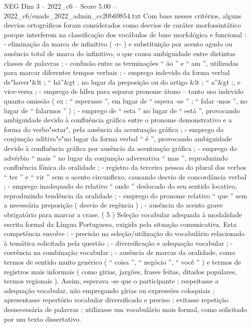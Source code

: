 \begin{textsample}{NEG Dim 3 – 2022\_c6 – Score 5.00 – 2022\_c6/enade\_2022\_admin\_cc20b69854.txt}
Com base nesses critérios, alguns desvios ortográficos foram considerados como desvios de caráter morfossintático porque interferem na classificação dos vocábulos de base morfológica e funcional : - eliminação da marca de infinitivo ( -r- ) e substituição por acento agudo ou ausência total de marca do infinitivo, o que causa ambiguidade entre distintas classes de palavras ; - confusão entre as terminações “ ão ” e “ am ”, utilizadas para marcar diferentes tempos verbais ; - emprego indevido da forma verbal de"haver"\&lt ; “ há”\&gt ; no lugar da preposição ou do artigo \&lt ; “ a”\&gt ;, e vice-versa ; - emprego de hífen para separar pronome átono – tanto uso indevido quanto omissão ( ex : “ esperasse ”, em lugar de “ espera -se ” ; “ falar -mos ”, no lugar de “ falarmos ” ) ; - emprego de “ esta ” no lugar de “ está ”, provocando ambiguidade devido à confluência gráfica entre o pronome demonstrativo e a forma do verbo"estar", pela ausência da acentuação gráfica ; - emprego da conjunção aditiva"e"no lugar da forma verbal “ é ”, provocando ambiguidade devido à confluência gráfica por ausência da acentuação gráfica ; - emprego do advérbio “ mais ” no lugar da conjunção adversativa “ mas ”, reproduzindo confluência fônica da oralidade ; - registro da terceira pessoa do plural dos verbos “ ter ” e “ vir ” sem o acento circunflexo, causando desvio de concordância verbal ; - emprego inadequado do relativo “ onde ” deslocado do seu sentido locativo, reproduzindo tendência da oralidade ; - emprego do pronome relativo “ que ” sem a necessária preposição ( desvio de regência ) ; - ausência do acento grave obrigatório para marcar a crase. ( 5 ) Seleção vocabular adequada à modalidade escrita formal da Língua Portuguesa, exigida pela situação comunicativa.
Esta competência envolve : - precisão na seleção/utilização do vocabulário relacionado à temática solicitada pela questão ; - diversificação e adequação vocabular ; - coerência na combinação vocabular ; - ausência de marcas da oralidade, como termos de sentido muito genérico ( “ coisa ”, “ negócio ”, “ você ” ) e termos de registros mais informais ( como gírias, jargões, frases feitas, ditados populares, termos regionais ).
Assim, esperava -se que o participante : respeitasse a adequação vocabular, não empregando gírias ou expressões coloquiais ; apresentasse repertório vocabular diversificado e preciso ; evitasse repetição desnecessária de palavras ; utilizasse um vocabulário mais formal, como solicitado por um texto dissertativo.

\end{textsample}
